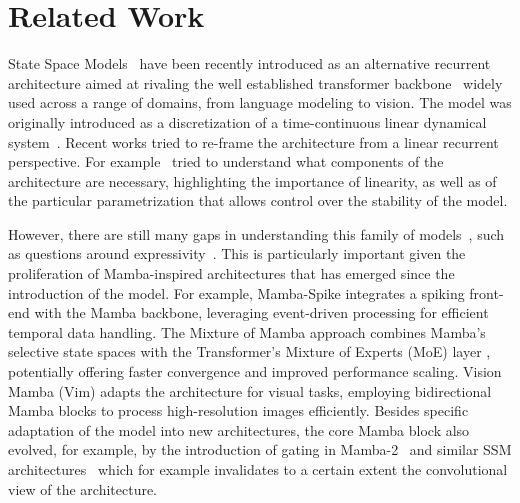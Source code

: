 \section{Related Work}
State Space Models~\cite{gu2020hippo, gu2021combining} have been recently introduced as an alternative recurrent architecture aimed at rivaling the well established transformer backbone~\cite{vaswani2017attention} widely used across a range of domains, from language modeling to vision. The model was originally introduced as a discretization of a time-continuous linear dynamical system~\cite{gu2021combining}. Recent works tried to re-frame the architecture from a linear recurrent perspective. For example~\cite{orvieto2023resurrecting} tried to understand what components of the architecture are necessary, highlighting the importance of linearity, as well as of the particular parametrization that allows control over the stability of the model.

However, there are still many gaps in understanding this family of models~\cite{team2024jamba}, such as questions around expressivity~\cite{orvieto2023universality}. This is particularly important given the proliferation of Mamba-inspired architectures that has emerged since the introduction of the model. 
For example, Mamba-Spike \cite{qin2024mamba} integrates a spiking front-end with the Mamba backbone, leveraging event-driven processing for efficient temporal data handling. The Mixture of Mamba approach combines Mamba's selective state spaces with the Transformer's Mixture of Experts (MoE) layer \cite{csordas2024moeut}, potentially offering faster convergence and improved performance scaling. Vision Mamba (Vim) \cite{zhu2401vision} adapts the architecture for visual tasks, employing bidirectional Mamba blocks to process high-resolution images efficiently. Besides specific adaptation of the model into new architectures, the core Mamba block also evolved, for example, by the introduction of gating in Mamba-2~\cite{mamba2023gu} and similar SSM architectures~\cite{de2024griffin,Beck2024xLSTM} which for example invalidates to a certain extent the convolutional view of the architecture. 

